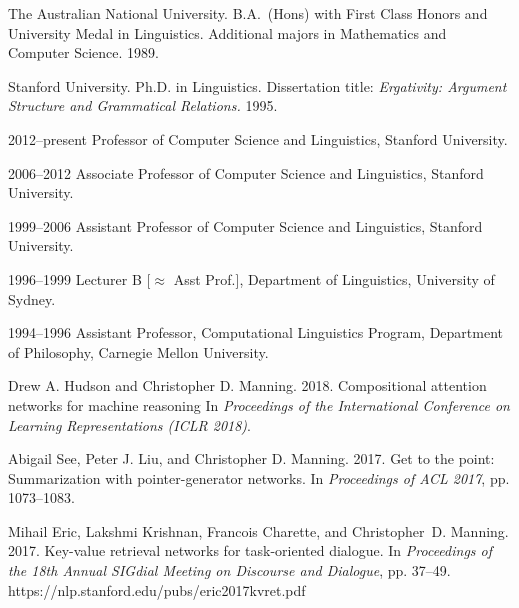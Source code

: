 \documentclass[11pt,letterpaper]{article}
\def\url#1{{\small\sf #1}}
\begin{document}
\begin{vita}
\begin{Professional Preparation}
\item The Australian National University. B.A.\ (Hons) with First Class Honors and University
Medal in Linguistics. Additional majors in Mathematics and Computer
Science. 1989.

\item Stanford University. Ph.D. in Linguistics.
Dissertation title: {\em Ergativity: Argument Structure and Grammatical
Relations.} 1995.

\end{Professional Preparation}

\begin{Appointments}[1996--present]
\item[2012--present] Professor of Computer Science and Linguistics,
  Stanford University.
\item[2006--2012] Associate Professor of Computer Science and
Linguistics, Stanford University.
\item[1999--2006] Assistant Professor of Computer Science and
Linguistics, Stanford University.
\item[1996--1999] Lecturer B [$\approx$ Asst Prof.], %
Department of Linguistics, University of Sydney. 
\item[1994--1996] Assistant Professor,
Computational Linguistics
Program, Department of Philosophy, Carnegie Mellon University.
\end{Appointments}

\begin{Products (most closely related)}

\item Drew A. Hudson and Christopher D. Manning. 2018. 
Compositional attention networks for machine reasoning
In {\em Proceedings of the International Conference on Learning
  Representations (ICLR 2018)}.

\item Abigail See, Peter J. Liu, and Christopher D. Manning. 2017. Get
  to the point: Summarization with pointer-generator networks. In
  \emph{Proceedings of ACL 2017}, pp. 1073--1083.

\item Mihail Eric, Lakshmi Krishnan, Francois Charette, and Christopher~D. Manning.
2017.
Key-value retrieval networks for task-oriented dialogue.
In {\em Proceedings of the 18th Annual SIGdial Meeting on Discourse and Dialogue}, pp. 37--49.
\url{https://nlp.stanford.edu/pubs/eric2017kvret.pdf}


\end{Products (most closely related)}
\end{vita}
\end{document}
